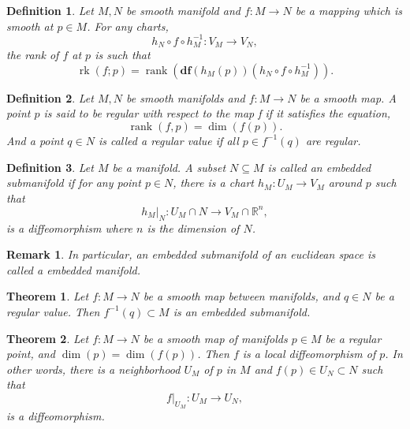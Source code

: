 \documentclass{article}
\newtheorem{theorem}{Theorem}[section]
\newtheorem{definition}{Definition}[section]
\newtheorem{remark}{Remark}[section]
\numberwithin{equation}{section}
\DeclareMathOperator{\rk}{rk}
\DeclareMathOperator{\rank}{rank}
\begin{document}
\begin{definition}
Let $M,N$ be smooth manifold and $f:M\to N$ be a mapping which is smooth at $p\in M$. For any charts, 
\begin{equation*}
h_N\circ f \circ h_M^{-1}:V_M\to V_N,
\end{equation*}
the rank of $f$ at $p$ is such that
\begin{equation*}
\rk(f;p) = \rank(\mathbf{df}(h_M(p))(h_N\circ f\circ h^{-1}_M)).
\end{equation*}
\end{definition}

\begin{definition}
Let $M,N$ be smooth manifolds and $f:M\to N$ be a smooth map. A point $p$ is said to be regular with respect to the map f if it satisfies the equation,
\begin{equation*}
\rank(f,p) = \dim(f(p)).
\end{equation*}
And a point $q\in N$ is called a regular value if all $p\in f^{-1}(q)$ are regular.
\end{definition}

\begin{definition}
Let $M$ be a manifold. A subset $N\subseteq M $ is called an embedded submanifold if for any point $p\in N$, there is a chart $h_M:U_M\to V_M$ around $p$ such that
\begin{equation*}
h_M|_N:U_M\cap N\to V_M\cap \mathbb{R}^n,
\end{equation*}
 is a diffeomorphism where $n$ is the dimension of $N$.\\
\end{definition}

\begin{remark}
In particular, an embedded submanifold of an euclidean space is called a embedded manifold.
\end{remark}

\begin{theorem}
Let $f:M\to N$ be a smooth map between manifolds, and $q\in N$ be a regular value. Then $f^{-1}(q)\subset M$ is an embedded submanifold.
\end{theorem}

\begin{theorem}
Let $f:M\to N$ be a smooth map of manifolds $p\in M$ be a regular point, and $\dim(p) = \dim(f(p))$. Then $f$ is a local diffeomorphism of $p$. In other words, there is a neighborhood $U_M$ of $p$ in $M$ and $f(p)\in U_N\subset N$ such that
\begin{equation*}
f|_{U_M}:U_M\to U_N,
\end{equation*}
is a diffeomorphism. 
\end{theorem}
\end{document}

